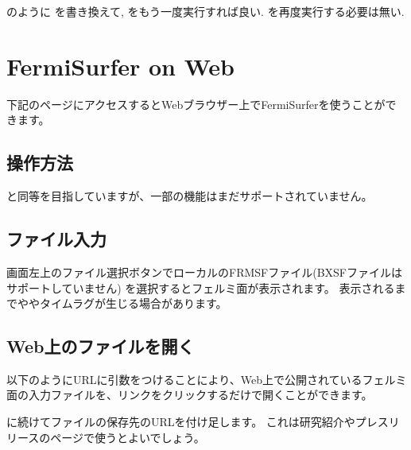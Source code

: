 \documentclass[letterpaper,10pt,dvipdfmx,openany]{sphinxmanual}
\begin{document}
\sphinxAtStartPar
のように  を書き換えて,  をもう一度実行すれば良い.
 を再度実行する必要は無い.

\begin{figure}[htbp]
\centering

\noindent{}
\end{figure}


\chapter{FermiSurfer on Web}
\label{\detokenize{onweb:fermisurfer-on-web}}\label{\detokenize{onweb::doc}}
\sphinxAtStartPar
下記のページにアクセスするとWebブラウザー上でFermiSurferを使うことができます。


\section{操作方法}
\label{\detokenize{onweb:id1}}
\sphinxAtStartPar
{\hyperref[\detokenize{ops:ops}]{}} と同等を目指していますが、一部の機能はまだサポートされていません。


\section{ファイル入力}
\label{\detokenize{onweb:id2}}
\sphinxAtStartPar
画面左上のファイル選択ボタンでローカルのFRMSFファイル(BXSFファイルはサポートしていません)
を選択するとフェルミ面が表示されます。
表示されるまでややタイムラグが生じる場合があります。


\section{Web上のファイルを開く}
\label{\detokenize{onweb:web}}
\sphinxAtStartPar
以下のようにURLに引数をつけることにより、Web上で公開されているフェルミ面の入力ファイルを、リンクをクリックするだけで開くことができます。

\sphinxAtStartPar
{}

\sphinxAtStartPar
{} に続けてファイルの保存先のURLを付け足します。
これは研究紹介やプレスリリースのページで使うとよいでしょう。
\end{document}
